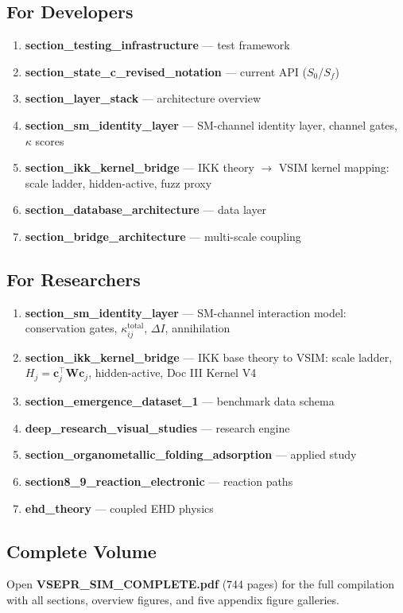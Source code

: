 \documentclass[11pt, letterpaper]{article}
\begin{document}
\subsection{For Developers}
\begin{enumerate}
\item \textbf{section\_testing\_infrastructure} --- test framework
\item \textbf{section\_state\_c\_revised\_notation} --- current API ($S_0$/$S_f$)
\item \textbf{section\_layer\_stack} --- architecture overview
\item \textbf{section\_sm\_identity\_layer} --- SM-channel identity layer, channel gates, $\kappa$ scores
\item \textbf{section\_ikk\_kernel\_bridge} --- IKK theory $\to$ VSIM kernel mapping: scale ladder, hidden-active, fuzz proxy
\item \textbf{section\_database\_architecture} --- data layer
\item \textbf{section\_bridge\_architecture} --- multi-scale coupling
\end{enumerate}

\subsection{For Researchers}
\begin{enumerate}
\item \textbf{section\_sm\_identity\_layer} --- SM-channel interaction model: conservation gates, $\kappa_{ij}^{\mathrm{total}}$, $\Delta I$, annihilation
\item \textbf{section\_ikk\_kernel\_bridge} --- IKK base theory to VSIM: scale ladder, $H_j = \mathbf{c}_j^\top \mathbf{W}\mathbf{c}_j$, hidden-active, Doc III Kernel V4
\item \textbf{section\_emergence\_dataset\_1} --- benchmark data schema
\item \textbf{deep\_research\_visual\_studies} --- research engine
\item \textbf{section\_organometallic\_folding\_adsorption} --- applied study
\item \textbf{section8\_9\_reaction\_electronic} --- reaction paths
\item \textbf{ehd\_theory} --- coupled EHD physics
\end{enumerate}

\subsection{Complete Volume}
Open \textbf{VSEPR\_SIM\_COMPLETE.pdf} (744 pages) for the full compilation
with all sections, overview figures, and five appendix figure galleries.
\end{document}
